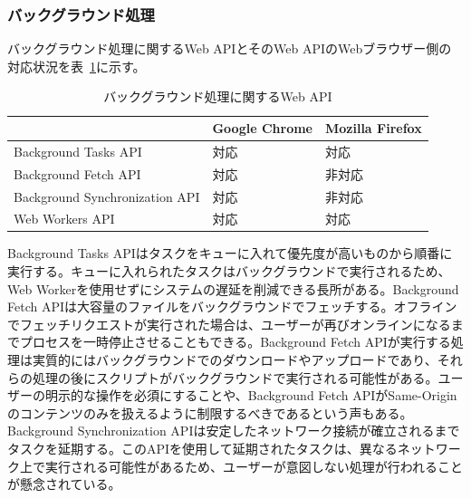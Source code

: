 \subsubsection{バックグラウンド処理}\label{subsubsection:バックグラウンド処理}
バックグラウンド処理に関するWeb APIとそのWeb APIのWebブラウザー側の対応状況を表~\ref{table:バックグラウンド処理に関するWeb API}に示す。
\begin{table}
  \caption{バックグラウンド処理に関するWeb API}\label{table:バックグラウンド処理に関するWeb API}
  \centering
  \begin{tabular}{|p{20em}|p{10em}|p{10em}|}
    \hline
    & Google Chrome & Mozilla Firefox \\ \hline
    Background Tasks API & 対応 & 対応 \\ \hline
    Background Fetch API & 対応 & 非対応 \\ \hline
    Background Synchronization API & 対応 & 非対応 \\ \hline
    Web Workers API & 対応 & 対応 \\ \hline
  \end{tabular}
\end{table}
Background Tasks APIはタスクをキューに入れて優先度が高いものから順番に実行する。キューに入れられたタスクはバックグラウンドで実行されるため、Web Workerを使用せずにシステムの遅延を削減できる長所がある。Background Fetch APIは大容量のファイルをバックグラウンドでフェッチする。オフラインでフェッチリクエストが実行された場合は、ユーザーが再びオンラインになるまでプロセスを一時停止させることもできる。Background Fetch APIが実行する処理は実質的にはバックグラウンドでのダウンロードやアップロードであり、それらの処理の後にスクリプトがバックグラウンドで実行される可能性がある。ユーザーの明示的な操作を必須にすることや、Background Fetch APIがSame-Originのコンテンツのみを扱えるように制限するべきであるという声もある。Background Synchronization APIは安定したネットワーク接続が確立されるまでタスクを延期する。このAPIを使用して延期されたタスクは、異なるネットワーク上で実行される可能性があるため、ユーザーが意図しない処理が行われることが懸念されている。
